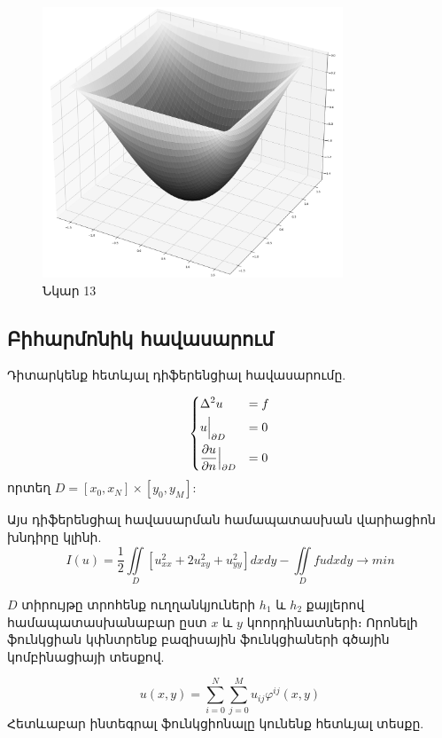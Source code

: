 \documentclass[fleqn, bachelor,subf,12pt,notitlepage]{article}
\begin{document}
\begin{figure}[h!]
\centering
\includegraphics[width=0.8\textwidth]{images/poisson_solution}
\caption{\hfill Նկար 13}
\end{figure}

\newpage
\subsection*{Բիհարմոնիկ հավասարում}

Դիտարկենք հետևյալ դիֆերենցիալ հավասարումը.

$$\begin{dcases}
								\Delta^{2} u &=f \\
								u \Big |_{\partial D} &= 0\\
								\dfrac{\partial u}{\partial n} \Big |_{\partial D} &= 0
\end{dcases}$$
որտեղ $D = \left[x_{0}, x_{N}\right] \times \left[y_{0}, y_{M}\right]$:

Այս դիֆերենցիալ հավասարման  համապատասխան վարիացիոն խնդիրը կլինի.
			$$I(u) = \frac{1}{2}\iint \limits_{D} \left[u_{xx}^{2} + 2u_{xy}^{2} + u_{yy}^{2} \right]dxdy - \iint \limits_{D} fudxdy \longrightarrow min$$

$D$ տիրույթը տրոհենք ուղղանկյուների $h_{1}$ և $h_{2}$ քայլերով համապատասխանաբար ըստ $x$ և $y$ կոորդինատների։
\noindent Որոնելի ֆունկցիան կփնտրենք բազիսային ֆունկցիաների գծային կոմբինացիայի տեսքով.

					$$u(x,y) = \sum_{i=0}^{N} \sum_{j=0}^{M} u_{ij}\varphi^{ij}(x,y)$$
\noindent Հետևաբար ինտեգրալ ֆունկցիոնալը կունենք հետևյալ տեսքը.
\end{document}
